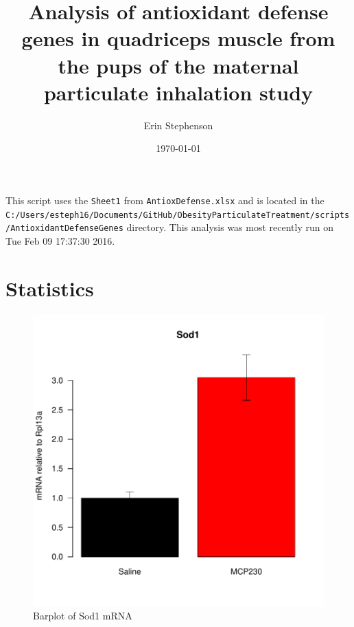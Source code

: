 \documentclass{article}
\begin{document}


\title{Analysis of antioxidant defense genes in quadriceps muscle from the pups of the maternal particulate inhalation study}
\author{Erin Stephenson}
\date{\today}
\maketitle

This script uses the \verb+Sheet1+ from \verb+AntioxDefense.xlsx+ and is located in the \verb+C:/Users/esteph16/Documents/GitHub/ObesityParticulateTreatment/scripts/AntioxidantDefenseGenes+ directory.  This analysis was most recently run on Tue Feb 09 17:37:30 2016.  

\section*{Statistics}
\begin{figure}
\begin{center}
\includegraphics{MaternalParticulateAntioxDefense-barplotSod1}
\end{center}
\caption{Barplot of Sod1 mRNA}
\label{fig:barplotSod1}
\end{figure}
\end{document}
